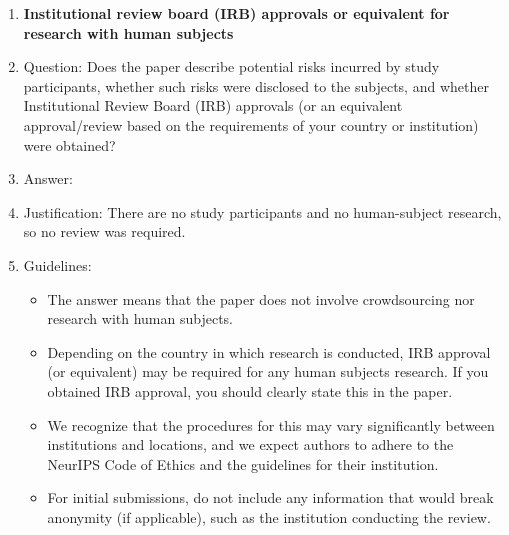 \begin{enumerate}
\item {\bf Institutional review board (IRB) approvals or equivalent for research with human subjects}
    \item[] Question: Does the paper describe potential risks incurred by study participants, whether such risks were disclosed to the subjects, and whether Institutional Review Board (IRB) approvals (or an equivalent approval/review based on the requirements of your country or institution) were obtained?
    \item[] Answer: \answerNA{}
    \item[] Justification: There are no study participants and no human-subject research, so no review was required.
    \item[] Guidelines:
    \begin{itemize}
        \item The answer \answerNA{} means that the paper does not involve crowdsourcing nor research with human subjects.
        \item Depending on the country in which research is conducted, IRB approval (or equivalent) may be required for any human subjects research. If you obtained IRB approval, you should clearly state this in the paper. 
        \item We recognize that the procedures for this may vary significantly between institutions and locations, and we expect authors to adhere to the NeurIPS Code of Ethics and the guidelines for their institution. 
        \item For initial submissions, do not include any information that would break anonymity (if applicable), such as the institution conducting the review.
    \end{itemize}


\end{enumerate}
